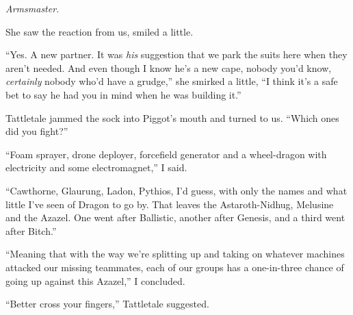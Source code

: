 \emph{Armsmaster.}



She saw the reaction from us, smiled a little.



``Yes.  A new partner.  It was \emph{his} suggestion that we park the suits here when they aren't needed.  And even though I know he's a new cape, nobody you'd know, \emph{certainly} nobody who'd have a grudge,'' she smirked a little, ``I think it's a safe bet to say he had you in mind when he was building it.''



Tattletale jammed the sock into Piggot's mouth and turned to us.  ``Which ones did you fight?''



``Foam sprayer, drone deployer, forcefield generator and a wheel-dragon with electricity and some electromagnet,'' I said.



``Cawthorne, Glaurung, Ladon, Pythios, I'd guess, with only the names and what little I've seen of Dragon to go by.  That leaves the Astaroth-Nidhug, Melusine and the Azazel.  One went after Ballistic, another after Genesis, and a third went after Bitch.''



``Meaning that with the way we're splitting up and taking on whatever machines attacked our missing teammates, each of our groups has a one-in-three chance of going up against this Azazel,'' I concluded.



``Better cross your fingers,'' Tattletale suggested.





